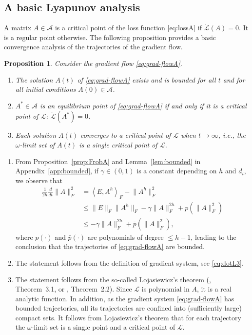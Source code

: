 \documentclass{article}
\makeatletter
\renewenvironment{proof}[1][\proofname]{
  \par\pushQED{\qed}\normalfont
  \topsep6\p@\@plus6\p@\relax
  \trivlist\item[\hskip\labelsep\bfseries#1\@addpunct{.}]
  \ignorespaces
}{
  \popQED\endtrivlist\@endpefalse
}
\newtheorem{proposition}{Proposition}
\newcommand{\1}{\mathds{1}}
\newcommand{\benu}{\begin{enumerate}}
\newcommand{\eenu}{\end{enumerate}}
\makeatother
\begin{document}
\subsection{A basic Lyapunov analysis}

A matrix $ A \in \mathcal{A} $ is a critical point of the loss function \eqref{eq:lossA} if $ \dot{\mathcal{L}}(A) =0$. It is a regular point otherwise. 
The following proposition provides a basic convergence analysis of the trajectories of the gradient flow.

\begin{proposition}
\label{prop:dotL}
Consider the gradient flow \eqref{eq:grad-flowA}.
\benu
\item The solution $A(t)$ of \eqref{eq:grad-flowA} exists and is bounded for all $t$ and for all initial conditions $ A(0) \in \mathcal{A}$.
\item $ A^\ast \in \mathcal{A} $ is an equilibrium point of \eqref{eq:grad-flowA} if and only if it is a critical point of $ \mathcal{L}$: $ \dot{\mathcal{L}}(A^\ast) =0 $.
\item Each solution $ A(t)$ converges to a critical point of $ \mathcal{L}$ when $ t\to \infty$, i.e., the $ \omega $-limit set of $A(t)$ is a single critical point of $ \mathcal{L}$. 
\eenu
\end{proposition}


\begin{proof}
\benu
\item 
From Proposition~\ref{prop:FrobA} and Lemma~\ref{lem:bounded} in Appendix~\ref{app:bounded}, if $ \gamma \in (0, 1) $ is a constant depending on $h$ and $ d_i$, we observe that
\begin{align}
	\frac{1}{2h}\frac{d}{dt} \lVert A \rVert^{2}_F &= \left\langle E,A^h\right\rangle_F - \lVert A^h \rVert^{2}_F \nonumber \\
	& \leq \lVert E \rVert_F \lVert A^h \rVert_F - \gamma\lVert A \rVert^{2h}_F + p\left(\lVert A \rVert^{2}_F\right) \nonumber \\
	& \leq - \gamma\lVert A \rVert^{2h}_F + \bar{p}\left(\lVert A \rVert^{2}_F\right), 
\end{align}
where $ p(\cdot) $ and $\bar{p}(\cdot) $ are polynomials of degree $\leq h-1$, leading to the conclusion that the trajectories of \eqref{eq:grad-flowA} are bounded.
\item The statement follows from the definition of gradient system, see \eqref{eq:dotL3}. 
\item The statement follows from the so-called Lojasiewicz's theorem (\cite{bah2022learning}, Theorem~3.1, or \cite{chitour2018geometric}, Theorem~2.2). 
Since $ \mathcal{L}$ is polynomial in $A$, it is a real analytic function. In addition, as the gradient system \eqref{eq:grad-flowA} has bounded trajectories, all its trajectories are confined into (sufficiently large) compact sets. It follows from Lojasiewicz's theorem that for each trajectory the $ \omega$-limit set is a single point and a critical point of $ \mathcal{L}$. 
 \eenu
\end{proof}
\end{document}
